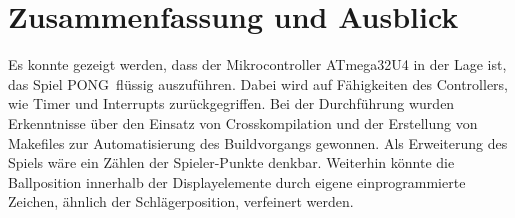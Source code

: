 \chapter{Zusammenfassung und Ausblick}
\label{cha:Fazit}
Es konnte gezeigt werden, dass der Mikrocontroller ATmega32U4 in der Lage ist, das Spiel \glqq PONG\grqq\ flüssig auszuführen. Dabei wird auf Fähigkeiten des Controllers, wie Timer und Interrupts zurückgegriffen. Bei der Durchführung wurden Erkenntnisse über den Einsatz von Crosskompilation und der Erstellung von Makefiles zur Automatisierung des Buildvorgangs gewonnen. Als Erweiterung des Spiels wäre ein Zählen der Spieler-Punkte denkbar. Weiterhin könnte die Ballposition innerhalb der Displayelemente durch eigene einprogrammierte Zeichen, ähnlich der Schlägerposition, verfeinert werden.